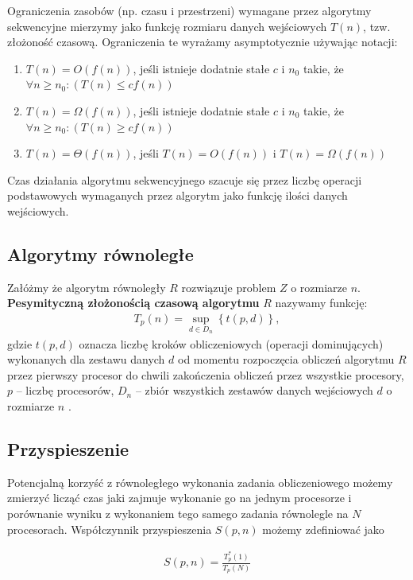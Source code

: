 Ograniczenia zasobów (np. czasu i przestrzeni) wymagane przez algorytmy sekwencyjne mierzymy jako funkcję rozmiaru danych wejściowych \(T(n)\), tzw. złożoność czasową. Ograniczenia te wyrażamy asymptotycznie używając notacji:

\begin{enumerate}
\item{\(T(n) = O(f(n))\), jeśli istnieje dodatnie stałe \(c\) i \(n_0\) takie, że \(\forall{n \geq n_0}: (T(n)\leq cf(n)) \)}
\item{\(T(n) = \Omega(f(n))\), jeśli istnieje dodatnie stałe \(c\) i \(n_0\) takie, że \(\forall{n \geq n_0}: (T(n)\geq cf(n)) \)}
\item{\(T(n) = \Theta(f(n))\), jeśli \(T(n)=O(f(n))\) i \(T(n)=\Omega(f(n))\)}
\end{enumerate}
Czas działania algorytmu sekwencyjnego szacuje się przez liczbę operacji podstawowych wymaganych przez algorytm jako funkcję ilości danych wejściowych.
\subsection{Algorytmy równoległe}

Załóżmy że algorytm równoległy \(R\) rozwiązuje problem \(Z\) o rozmiarze \(n\). \textbf{Pesymityczną złożonością czasową algorytmu} \(R\) nazywamy funkcję:\\

\begin{align}
T_{p}(n) = \sup_{d\in{D_n}}{\left\{t(p,d)\right\}},
\end{align}
gdzie \(t(p,d)\) oznacza liczbę kroków obliczeniowych (operacji dominujących) wykonanych dla zestawu danych \(d\) od momentu rozpoczęcia obliczeń algorytmu \(R\) przez pierwszy procesor do chwili zakończenia obliczeń przez wszystkie procesory, \(p\) -- liczbę procesorów, \(D_n\) -- zbiór wszystkich zestawów danych wejściowych \(d\) o rozmiarze \(n\) \cite{Czech}.


\subsection{Przyspieszenie}

Potencjalną korzyść z równoległego wykonania zadania obliczeniowego możemy zmierzyć licząć czas jaki zajmuje wykonanie go na jednym procesorze i porównanie wyniku z wykonaniem tego samego zadania równolegle na \(N\) procesorach. Współczynnik przyspieszenia \(S(p, n)\) możemy zdefiniować jako

\begin{align}\label{def:speedup_abs}
 S(p, n)=\frac{T^{*}_{p}(1)}{T_{p}(N)}
\end{align}

